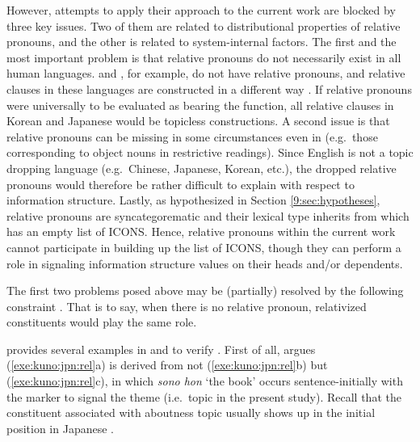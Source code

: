 However, attempts to apply their approach to the current work are
blocked by three key issues. Two of them are
related to distributional properties of relative pronouns, and the
other is related to system-internal factors.  The first and the most
important problem is that relative pronouns do not necessarily exist
in all human languages.  and , for example,
do not have relative pronouns, and relative clauses in these languages
are constructed in a different way \citep{baldwin:98,kim:park:00}. If
relative pronouns were universally to be evaluated as bearing the
 function, all relative clauses in Korean and Japanese
would be topicless constructions. A second issue is that
relative pronouns can be missing in some circumstances even in
 (e.g.\ those corresponding to object nouns in
restrictive readings). Since English is not a topic dropping language
(e.g.\ Chinese, Japanese, Korean, etc.), the dropped relative pronouns
would therefore be rather difficult to explain with respect to
information structure. Lastly, as hypothesized in
Section \ref{9:sec:hypotheses}, relative pronouns are syncategorematic and
their lexical type inherits from  which has an
empty list of ICONS. Hence, relative pronouns within the current work
cannot participate in building up the list of ICONS, though they can
perform a role in signaling information structure values on their
heads and/or dependents.





The first two problems posed above may be (partially) resolved by the
following constraint \citep[19f]{bresnan:mchombo:87}. That is to say, when there is no relative pronoun,
relativized constituents would play the same role.



\noindent \citeauthor{kuno:76} provides several examples in
 and  to verify . First of all,
\citeauthor{kuno:76} argues (\ref{exe:kuno:jpn:rel}a) is derived from
not (\ref{exe:kuno:jpn:rel}b) but (\ref{exe:kuno:jpn:rel}c), in which
\textit{sono hon} `the book' occurs sentence-initially with the 
marker \wa to signal the theme (i.e.\ topic in the present study).
Recall that the constituent associated with aboutness topic usually
shows up in the initial position in Japanese
\citep{maki:etal:99,vermeulen:09}.


